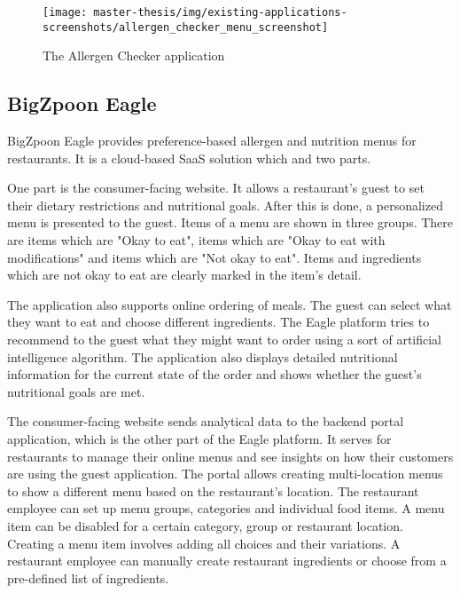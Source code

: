   \begin{figure}[h]
    \centering
    \texttt{[image: master-thesis/img/existing-applications-screenshots/allergen\_checker\_menu\_screenshot]}
    \caption{The Allergen Checker application}
  \end{figure}

\subsection*{BigZpoon Eagle}
  BigZpoon Eagle provides preference-based allergen and nutrition menus for \linebreak restaurants.
  It is a cloud-based SaaS solution which and two parts.

  One part is the consumer-facing website.
  It allows a restaurant's guest to set their dietary restrictions and nutritional goals.
  After this is done, a personalized menu is presented to the guest.
  Items of a menu are shown in three groups.
  There are items which are "Okay to eat", items which are "Okay to eat with modifications" and items which are "Not okay to eat".
  Items and ingredients which are not okay to eat are clearly marked in the item's detail.
  
  The application also supports online ordering of meals.
  The guest can select what they want to eat and choose different ingredients.
  The Eagle platform tries to recommend to the guest what they might want to order using a sort of artificial intelligence algorithm.
  The application also displays detailed nutritional information for the current state of the order and shows whether the guest's nutritional goals are met.

  The consumer-facing website sends analytical data to the backend portal application, which is the other part of the Eagle platform.
  It serves for restaurants to manage their online menus and see insights on how their customers are using the guest application.
  The portal allows creating multi-location menus to show a different menu based on the restaurant's location.
  The restaurant employee can set up menu groups, categories and individual food items.
  A menu item can be disabled for a certain category, group or restaurant location.
  Creating a menu item involves adding all choices and their variations.
  A restaurant employee can manually create restaurant ingredients or choose from a pre-defined list of ingredients.

